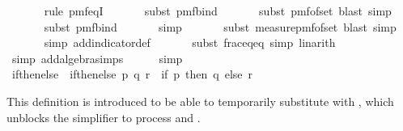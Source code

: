 \begin{isabellebody}
\ \ \ \ \ \isamarkupfalse%
\ {\isacharparenleft}{\kern0pt}rule\ pmf{\isacharunderscore}{\kern0pt}eqI{\isacharparenright}{\kern0pt}\isanewline
\ \ \ \ \ \isamarkupfalse%
\ {\isacharparenleft}{\kern0pt}subst\ pmf{\isacharunderscore}{\kern0pt}bind{\isacharparenright}{\kern0pt}\isanewline
\ \ \ \ \ \isamarkupfalse%
\ {\isacharparenleft}{\kern0pt}subst\ pmf{\isacharunderscore}{\kern0pt}of{\isacharunderscore}{\kern0pt}set{\isacharcomma}{\kern0pt}\ blast{\isacharcomma}{\kern0pt}\ simp{\isacharparenright}{\kern0pt}\isanewline
\ \ \ \ \ \isamarkupfalse%
\ {\isacharparenleft}{\kern0pt}subst\ pmf{\isacharunderscore}{\kern0pt}bind{\isacharparenright}{\kern0pt}\isanewline
\ \ \ \ \ \isamarkupfalse%
\ {\isacharparenleft}{\kern0pt}simp{\isacharparenright}{\kern0pt}\isanewline
\ \ \ \ \ \isamarkupfalse%
\ {\isacharparenleft}{\kern0pt}subst\ measure{\isacharunderscore}{\kern0pt}pmf{\isacharunderscore}{\kern0pt}of{\isacharunderscore}{\kern0pt}set{\isacharcomma}{\kern0pt}\ blast{\isacharcomma}{\kern0pt}\ simp{\isacharparenright}{\kern0pt}\isanewline
\ \ \ \ \ \isamarkupfalse%
\ {\isacharparenleft}{\kern0pt}simp\ add{\isacharcolon}{\kern0pt}indicator{\isacharunderscore}{\kern0pt}def{\isacharparenright}{\kern0pt}\isanewline
\ \ \ \ \ \isamarkupfalse%
\ {\isacharparenleft}{\kern0pt}subst\ frac{\isacharunderscore}{\kern0pt}eq{\isacharunderscore}{\kern0pt}eq{\isacharcomma}{\kern0pt}\ simp{\isacharcomma}{\kern0pt}\ linarith{\isacharparenright}{\kern0pt}\isanewline
\ \ \ \ \ \isamarkupfalse%
\ {\isacharparenleft}{\kern0pt}simp\ add{\isacharcolon}{\kern0pt}algebra{\isacharunderscore}{\kern0pt}simps{\isacharparenright}{\kern0pt}\isanewline
\ \ \ \ \isamarkupfalse%
\ simp\isanewline
{}\isamarkupfalse%
%
\endisatagproof
{\isafoldproof}%
%
\isadelimproof
\isanewline
%
\endisadelimproof
\isanewline
{}\isamarkupfalse%
\ if{\isacharunderscore}{\kern0pt}then{\isacharunderscore}{\kern0pt}else\ \ {\isachardoublequoteopen}if{\isacharunderscore}{\kern0pt}then{\isacharunderscore}{\kern0pt}else\ p\ q\ r\ {\isacharequal}{\kern0pt}\ {\isacharparenleft}{\kern0pt}if\ p\ then\ q\ else\ r{\isacharparenright}{\kern0pt}{\isachardoublequoteclose}%
\begin{isamarkuptext}%
This definition is introduced to be able to temporarily substitute 
with , which unblocks the simplifier to process  and .%

\end{isamarkuptext}
\end{isabellebody}
